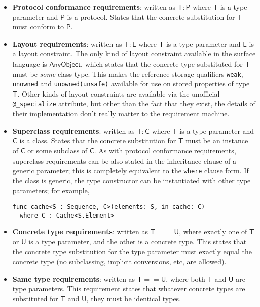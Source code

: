\documentclass[headsepline,bibliography=totoc]{scrreport}
\newcommand{\namesym}[1]{\mathsf{#1}}
\newcommand{\proto}[1]{\bm{\mathsf{#1}}}
\theoremstyle{definition}
\theoremstyle{definition}
\theoremstyle{definition}
\begin{document}
\begin{itemize}
\item \textbf{Protocol conformance requirements}: written as $\namesym{T}\colon\proto{P}$ where $\namesym{T}$ is a type parameter and $\proto{P}$ is a protocol. States that the concrete substitution for $\namesym{T}$ must conform to $\proto{P}$.
\item \textbf{Layout requirements}: written as $\namesym{T}\colon\proto{L}$ where $\namesym{T}$ is a type parameter and $\proto{L}$ is a layout constraint. The only kind of layout constraint available in the surface language is $\namesym{AnyObject}$, which states that the concrete type substituted for $\namesym{T}$ must be \emph{some} class type. This makes the reference storage qualifiers \texttt{weak}, \texttt{unowned} and \texttt{unowned(unsafe)} available for use on stored properties of type $\namesym{T}$. Other kinds of layout constraints are available via the unofficial \texttt{@\_specialize} attribute, but other than the fact that they exist, the details of their implementation don't really matter to the requirement machine.
\item \textbf{Superclass requirements}: written as $\namesym{T}\colon\namesym{C}$ where $\namesym{T}$ is a type parameter and $\namesym{C}$ is a class. States that the concrete substitution for $\namesym{T}$ must be an instance of $\namesym{C}$ or some subclass of $\namesym{C}$. As with protocol conformance requirements, superclass requirements can be also stated in the inheritance clause of a generic parameter; this is completely equivalent to the \texttt{where} clause form. If the class is generic, the type constructor can be instantiated with other type parameters; for example,
\begin{Verbatim}
func cache<S : Sequence, C>(elements: S, in cache: C)
  where C : Cache<S.Element>
\end{Verbatim}
\item \textbf{Concrete type requirements}: written as $\namesym{T} == \namesym{U}$, where exactly one of $\namesym{T}$ or $\namesym{U}$ is a type parameter, and the other is a concrete type. This states that  the concrete type substitution for the type parameter must exactly equal the concrete type (no subclassing, implicit conversions, etc, are allowed).
\item \textbf{Same type requirements}: written as $\namesym{T}==\namesym{U}$, where both $\namesym{T}$ and $\namesym{U}$ are type parameters. This requirement states that whatever concrete types are substituted for $\namesym{T}$ and $\namesym{U}$, they must be identical types.
\end{itemize}
\end{document}
